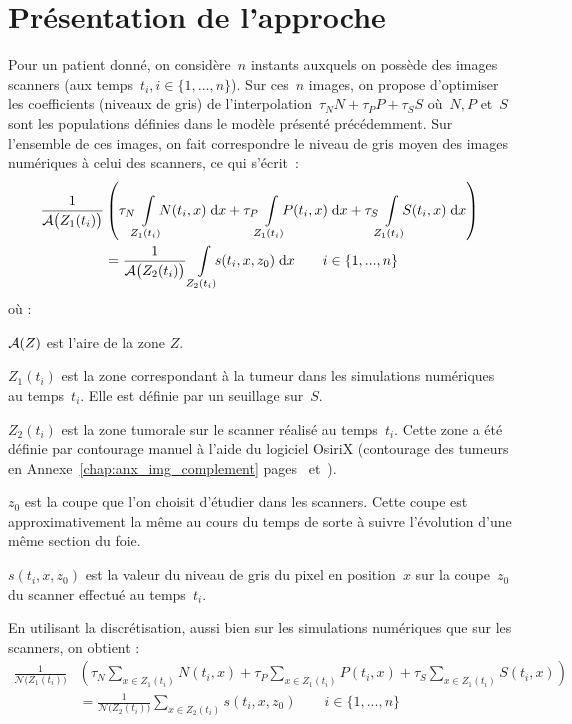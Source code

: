 \documentclass[main.tex]{subfiles}
\begin{document}
\section{Présentation de l'approche}
Pour un patient donné, on considère~$n$ instants auxquels on possède des images scanners (aux temps~$t_i, i\in \{ 1,...,n \}$).%
Sur ces~$n$ images, on propose d'optimiser les coefficients (niveaux de gris) de l'interpolation~$\tau_N N + \tau_P P + \tau_S S$ où~$N, P$ et~$S$ sont les populations définies dans le modèle présenté précédemment. Sur l'ensemble de ces images, on fait correspondre le niveau de gris moyen des images numériques à celui des scanners, ce qui s'écrit~:
\begin{equation}
\label{eq:optim_grey_integ_aire}
\begin{aligned}
\frac{1}{\aire\big(Z_1(t_i)\big)}&\left( \tau_N\intperso{Z_1(t_i)}N(t_i,x) \dx + \tau_P\intperso{Z_1(t_i)}P(t_i,x) \dx + \tau_S\intperso{Z_1(t_i)} S(t_i,x) \dx \right) \\
&= \frac{1}{\aire\big(Z_2(t_i)\big)} \ \intperso{Z_2(t_i)} s(t_i,x,z_0) \dx \qquad i \in \{1,...,n\}
\end{aligned}
\end{equation}
où : \begin{myitemize}
\item $\mathcal{A}(Z)$ est l'aire de la zone $Z$.
\item $Z_1(t_i)$ est la zone correspondant à la tumeur dans les simulations numériques au temps~$t_i$. Elle est définie par un seuillage sur~$S$.
\item $Z_2(t_i)$ est la zone tumorale sur le scanner réalisé au temps~$t_i$. Cette zone a été définie par contourage manuel à l'aide du logiciel OsiriX (\cf contourage des tumeurs en Annexe~\ref{chap:anx_img_complement} pages~\pageref{fig:contourageNber} et~\pageref{fig:contourageChen}).
\item $z_0$ est la coupe que l'on choisit d'étudier dans les scanners. Cette coupe est approximativement la même au cours du temps de sorte à suivre l'évolution d'une même section du foie. 
\item $s(t_i,x,z_0)$ est la valeur du niveau de gris du pixel en position~$x$ sur la coupe~$z_0$ du scanner effectué au temps~$t_i$.
\end{myitemize}
En utilisant la discrétisation, aussi bien sur les simulations numériques que sur les scanners, on obtient :
\begin{equation}
\label{eq:optim_grey_eq_discr}
\begin{aligned}
\frac{1}{\mathcal{N}\big(Z_1(t_i)\big)}&\left( \tau_N\!\!\sum_{x\in Z_1(t_i)}\!\!N(t_i,x) + \tau_P\!\!\sum_{x\in Z_1(t_i)}\!\!P(t_i,x) + \tau_S\!\!\sum_{x\in Z_1(t_i)}\!\!S(t_i,x) \right) \\
&= \frac{1}{\mathcal{N}\big(Z_2(t_i)\big)} \sum_{x\in Z_2(t_i)}\!\! s(t_i,x,z_0) \qquad i \in \{1,...,n\}
\end{aligned}
\end{equation}
\end{document}
